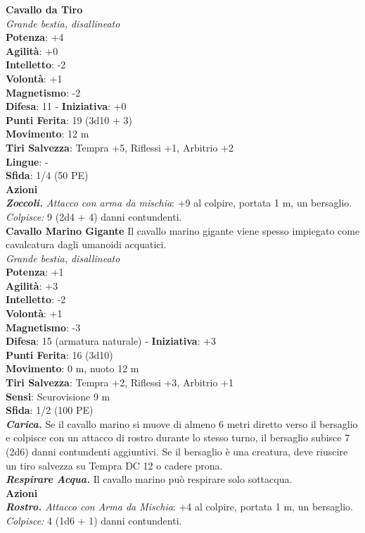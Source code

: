 \begin{multicols}{2}
\medskip\textbf{Cavallo da Tiro}\\
\emph{Grande bestia, disallineato}\\
\textbf{Potenza}: +4\\
\textbf{Agilità}: +0\\
\textbf{Intelletto}: -2\\
\textbf{Volontà}: +1\\
\textbf{Magnetismo}: -2\\
\textbf{Difesa}: 11 - \textbf{Iniziativa}: +0\\
\textbf{Punti Ferita}: 19 (3d10 + 3)\\
\textbf{Movimento}: 12 m\\
\textbf{Tiri Salvezza}:  Tempra +5, Riflessi +1, Arbitrio +2 \\
\textbf{Lingue}: -\\
\textbf{Sfida}: 1/4 (50 PE)\smallskip\\
\smallskip\textbf{Azioni}\\
\emph{\textbf{Zoccoli.} Attacco con arma da mischia}: +9 al colpire, portata 1 m, un bersaglio.\\
\emph{Colpisce:} 9 (2d4 + 4) danni contundenti.\\

\medskip\textbf{Cavallo Marino Gigante}
Il cavallo marino gigante viene spesso impiegato come cavalcatura dagli umanoidi acquatici.\\
\emph{Grande bestia, disallineato}\\
\textbf{Potenza}: +1\\
\textbf{Agilità}: +3\\
\textbf{Intelletto}: -2\\
\textbf{Volontà}: +1\\
\textbf{Magnetismo}: -3\\
\textbf{Difesa}: 15 (armatura naturale) - \textbf{Iniziativa}: +3\\
\textbf{Punti Ferita}: 16 (3d10)\\
\textbf{Movimento}: 0 m, nuoto 12 m\\
\textbf{Tiri Salvezza}: Tempra +2, Riflessi +3, Arbitrio +1 \\
\textbf{Sensi}: Scurovisione 9 m\\
\textbf{Sfida}: 1/2 (100 PE)\smallskip\\
\emph{\textbf{Carica.}} Se il cavallo marino si muove di almeno 6 metri diretto verso il bersaglio e colpisce con un attacco di rostro durante lo stesso turno, il bersaglio subisce 7 (2d6) danni contundenti aggiuntivi. Se il bersaglio è una creatura, deve riuscire un tiro salvezza su Tempra DC  12 o cadere prona.\\
\emph{\textbf{Respirare Acqua.}} Il cavallo marino può respirare solo sottacqua.\\
\smallskip\textbf{Azioni}\\
\emph{\textbf{Rostro.} Attacco con Arma da Mischia}: +4 al colpire, portata 1 m, un bersaglio.\\
\emph{Colpisce:} 4 (1d6 + 1) danni contundenti.\\


\end{multicols}
